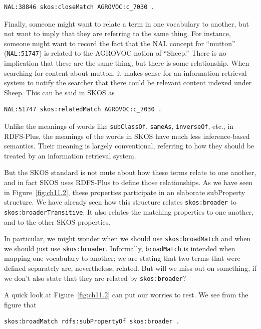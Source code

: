 \begin{lstlisting}
NAL:38846 skos:closeMatch AGROVOC:c_7030 .
\end{lstlisting}

Finally, someone might want to relate a term in one vocabulary to
another, but not want to imply that they are referring to the same
thing. For instance, someone might want to record the fact that the NAL
concept for ``mutton'' (\texttt{NAL:51747}) is related to the AGROVOC notion of
``Sheep.'' There is no implication that these are the same thing, but
there is some relationship. When searching for content about mutton, it
makes sense for an information retrieval system to notify the searcher
that there could be relevant content indexed under Sheep. This can be
said in SKOS as

\begin{lstlisting}
NAL:51747 skos:relatedMatch AGROVOC:c_7030 .
\end{lstlisting}

Unlike the meanings of words like \texttt{subClassOf}, \texttt{sameAs}, \texttt{inverseOf}, etc.,
in RDFS-Plus, the meanings of the words in SKOS have much less
inference-based semantics. Their meaning is largely conventional,
referring to how they should be treated by an information retrieval
system.

But the SKOS standard is not mute about how these terms relate to one
another, and in fact SKOS uses RDFS-Plus to define those relationships.
As we have seen in Figure~\ref{fig:ch11.2}, these properties participate in an
elaborate subProperty structure. We have already seen how this structure
relates \texttt{skos:broader} to \texttt{skos:broaderTransitive}. It also relates the
matching properties to one another, and to the other SKOS properties.

In particular, we might wonder when we should use \texttt{skos:broadMatch} and
when we should just use \texttt{skos:broader}. Informally, \texttt{broadMatch} is intended
when mapping one vocabulary to another; we are stating that two terms
that were defined separately are, nevertheless, related. But will we
miss out on something, if we don't also state that they are related by
\texttt{skos:broader}?

A quick look at Figure~\ref{fig:ch11.2} can put our worries to rest. We see from the
figure that

\begin{lstlisting}
skos:broadMatch rdfs:subPropertyOf skos:broader .
\end{lstlisting}

